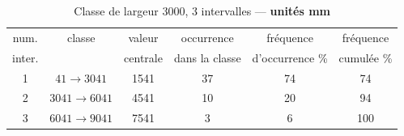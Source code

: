 \begin{enumerate}
\begin{table}[ht]
\caption{Classe de largeur 3000, 3 intervalles --- \textbf{unités mm}}
\begin{center}
\begin{tabular}{cccccc}
\hline
num. & classe & valeur & occurrence & fréquence & fréquence\\
inter. &  & centrale & dans la classe & d'occurrence \% & cumulée \%\\\hline
 1 & $  41 \rightarrow 3041$ & 1541 & 37 & 74 &  74\\
 2 & $3041 \rightarrow 6041$ & 4541 & 10 & 20 &  94\\
 3 & $6041 \rightarrow 9041$ & 7541 & 3 &  6 & 100\\
\hline
\end{tabular}
\end{center}
\label{tab:03}
\end{table}


\end{enumerate}
